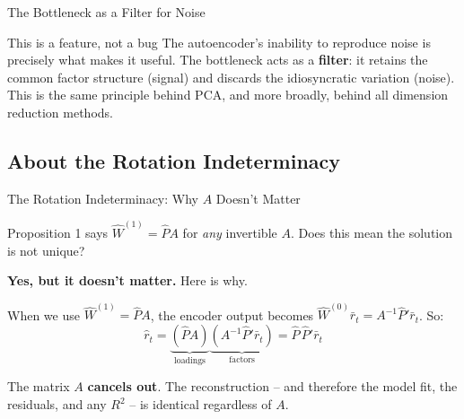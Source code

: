 \documentclass[aspectratio=169]{beamer}
\begin{document}
%
%
\begin{frame}{The Bottleneck as a Filter for Noise}

\begin{exampleblock}{This is a feature, not a bug}
The autoencoder's inability to reproduce noise is precisely what makes it useful. The bottleneck acts as a \textbf{filter}: it retains the common factor structure (signal) and discards the idiosyncratic variation (noise). This is the same principle behind PCA, and more broadly, behind all dimension reduction methods.
\end{exampleblock}

\end{frame}
%
\subsection{About the Rotation Indeterminacy}
%
\begin{frame}{The Rotation Indeterminacy: Why $A$ Doesn't Matter}

Proposition 1 says $\hat{W}^{(1)} = \hat{P}A$ for \textit{any} invertible $A$. Does this mean the solution is not unique?

\vspace{0.5em}

\textbf{Yes, but it doesn't matter.} Here is why.

\vspace{0.3em}

When we use $\hat{W}^{(1)} = \hat{P}A$, the encoder output becomes $\hat{W}^{(0)}\bar{r}_t = A^{-1}\hat{P}'\bar{r}_t$. So:
\[
\hat{r}_t = \underbrace{(\hat{P}A)}_{\text{loadings}} \underbrace{(A^{-1}\hat{P}'\bar{r}_t)}_{\text{factors}} = \hat{P}\,\hat{P}'\bar{r}_t
\]

The matrix $A$ \textbf{cancels out}. The reconstruction -- and therefore the model fit, the residuals, and any $R^2$ -- is identical regardless of $A$.
\end{frame}
%
%
\end{document}
